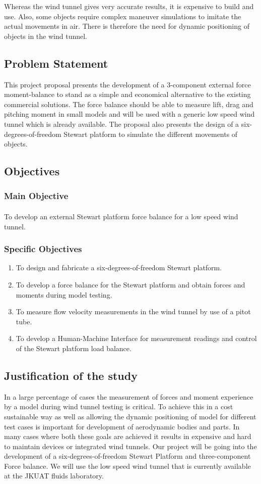 Whereas the wind tunnel gives very accurate results, it is expensive to build and use. Also, some objects require complex maneuver simulations to imitate the actual movements in air. There is therefore the need for dynamic positioning of objects in the wind tunnel.

\subsection{Problem Statement}This project proposal presents the development of a 3-component external force moment-balance to stand as a simple and economical alternative to the existing commercial solutions. The force balance should be able to measure lift, drag and pitching moment in small models and will be used with a generic low speed wind tunnel which is already available. The proposal also presents the design of a six-degrees-of-freedom Stewart platform to simulate the different movements of objects.
\subsection{Objectives}
\subsubsection{Main Objective}
\paragraph{} To develop an external Stewart platform force balance for a low speed wind tunnel. 
\subsubsection{Specific Objectives}
\begin{enumerate}
\item To design and fabricate a six-degrees-of-freedom Stewart platform.
\item To develop a force balance for the Stewart platform and obtain forces and moments during model testing.
\item To measure flow velocity measurements in the wind tunnel by use of a pitot tube.
\item To develop a Human-Machine Interface for measurement readings and control of the Stewart platform load balance.
\end{enumerate}
\subsection{Justification of the study}
In a large percentage of cases the measurement of forces and moment experience by a model during wind tunnel testing is critical. To achieve this in a cost sustainable way as well as allowing the dynamic positioning of model for different test cases is important for development of aerodynamic bodies and parts. In many cases where both these goals are achieved it results in expensive and hard to maintain devices or integrated wind tunnels. Our project will be going into the development of a six-degrees-of-freedom Stewart Platform and three-component Force balance. We will use the low speed wind tunnel that is currently available at the JKUAT fluids laboratory.
